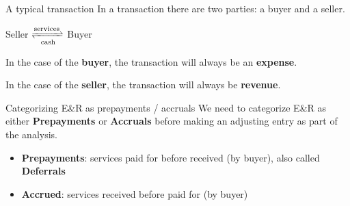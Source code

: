 \begin{theorem}
    {A typical transaction}
    In a transaction there are two parties: a buyer and a seller.

    Seller $\xrightleftharpoons[\text{cash}]{\text{services}}$ Buyer

    In the case of the \textbf{buyer}, the transaction will always be an \textbf{expense}.

    In the case of the \textbf{seller}, the transaction will always be \textbf{revenue}.
\end{theorem}

\begin{definition}
    {Categorizing E\&R as prepayments / accruals}
    We need to categorize E\&R as either \textbf{Prepayments} or \textbf{Accruals} before making an adjusting entry as part of the analysis.
    \begin{itemize}
        \item \textbf{Prepayments}: services paid for before received (by buyer), also called \textbf{Deferrals}
        \item \textbf{Accrued}: services received before paid for (by buyer)
    \end{itemize}

\end{definition}

